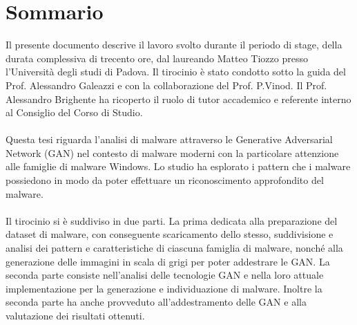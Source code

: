 \cleardoublepage
{}
{}
\begingroup
\let\clearpage\relax
\let\cleardoublepage\relax
\let\cleardoublepage\relax

\chapter*{Sommario}

Il presente documento descrive il lavoro svolto durante il periodo di stage, della durata complessiva di trecento ore, dal laureando Matteo Tiozzo presso l'Università degli studi di Padova.
Il tirocinio è stato condotto sotto la guida del Prof. Alessandro Galeazzi e con la collaborazione del Prof. P.Vinod.
Il Prof. Alessandro Brighente ha ricoperto il ruolo di tutor accademico e referente interno al Consiglio del Corso di Studio.
\\\\
Questa tesi riguarda l'analisi di malware attraverso le Generative Adversarial Network (GAN) nel contesto di malware moderni con la particolare attenzione alle famiglie di malware Windows. 
Lo studio ha esplorato i pattern che i malware possiedono in modo da poter effettuare un riconoscimento approfondito del malware. 
\\\\
Il tirocinio si è suddiviso in due parti.
La prima dedicata alla preparazione del dataset di malware, con conseguente scaricamento dello stesso, suddivisione e analisi dei pattern e caratteristiche di ciascuna famiglia di malware, nonché alla generazione delle immagini in scala di grigi per poter addestrare le GAN. La seconda parte consiste nell'analisi delle tecnologie GAN e nella loro attuale implementazione per la generazione e individuazione di malware. Inoltre la seconda parte ha anche provveduto all'addestramento delle GAN e alla valutazione dei risultati ottenuti.



\endgroup

\vfill
